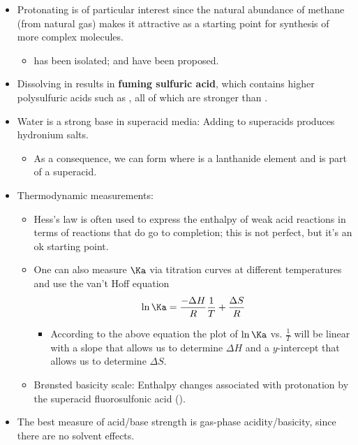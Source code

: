 \documentclass[../notes.tex]{subfiles}
\begin{document}
\begin{itemize}
    \item Protonating  is of particular interest since the natural abundance of methane (from natural gas) makes it attractive as a starting point for synthesis of more complex molecules.
    \begin{itemize}
        \item {} has been isolated;  and  have been proposed.
    \end{itemize}
    \item Dissolving  in  results in \textbf{fuming sulfuric acid}, which contains higher polysulfuric acids such as , all of which are stronger than .
    \item Water is a strong base in superacid media: Adding  to superacids produces hydronium salts.
    \begin{itemize}
        \item As a consequence, we can form  where  is a lanthanide element and  is part of a superacid.
    \end{itemize}
    \item Thermodynamic measurements:
    \begin{itemize}
        \item Hess's law is often used to express the enthalpy of weak acid reactions in terms of reactions that do go to completion; this is not perfect, but it's an ok starting point.
        \item One can also measure $\Ka$ via titration curves at different temperatures and use the van't Hoff equation
        \begin{equation*}
            \ln\Ka = \frac{-\Delta H}{R}\frac{1}{T}+\frac{\Delta S}{R}
        \end{equation*}
        \begin{itemize}
            \item According to the above equation the plot of $\ln\Ka$ vs. $\frac{1}{T}$ will be linear with a slope that allows us to determine $\Delta H$ and a $y$-intercept that allows us to determine $\Delta S$.
        \end{itemize}
        \item Br{\o}nsted basicity scale: Enthalpy changes associated with protonation by the superacid fluorosulfonic acid ().
    \end{itemize}
    \item The best measure of acid/base strength is gas-phase acidity/basicity, since there are no solvent effects.

\end{itemize}
\end{document}
